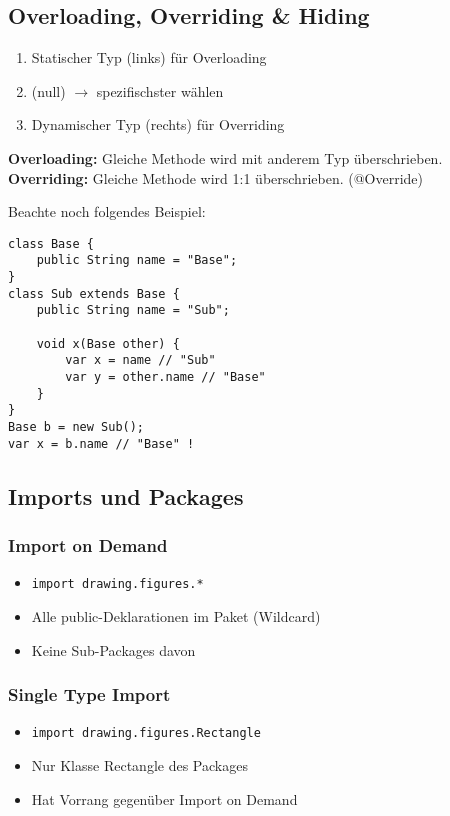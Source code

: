 \begin{multicols*}{5}
	\subsection{Overloading, Overriding \& Hiding}
	\begin{enumerate}
		\item Statischer Typ (links) für Overloading
		\item (null) $\rightarrow$ spezifischster wählen
		\item Dynamischer Typ (rechts) für Overriding
	\end{enumerate}
	\textbf{Overloading:} Gleiche Methode wird mit anderem Typ überschrieben.\\
	\textbf{Overriding:} Gleiche Methode wird 1:1 überschrieben. (@Override)
	
	Beachte noch folgendes Beispiel:
	\begin{lstlisting}
class Base { 
	public String name = "Base";
}
class Sub extends Base {
	public String name = "Sub";
	
	void x(Base other) {
		var x = name // "Sub"
		var y = other.name // "Base"
	}
}
Base b = new Sub();
var x = b.name // "Base" !
	\end{lstlisting}
	
	\columnbreak
	
	\subsection{Imports und Packages}
		\subsubsection{Import on Demand}
		\begin{itemize}
			\item \tiny \textcolor{b}{\texttt{import drawing.figures.*}} \footnotesize
			\item Alle public-Deklarationen im Paket (Wildcard)
			\item Keine Sub-Packages davon
		\end{itemize}
		\subsubsection{Single Type Import}
		\begin{itemize}
			\item \tiny \textcolor{b}{\texttt{import drawing.figures.Rectangle}} \footnotesize
			\item Nur Klasse Rectangle des Packages
			\item Hat Vorrang gegen{\"u}ber Import on Demand
		\end{itemize}
	

\end{multicols*}
